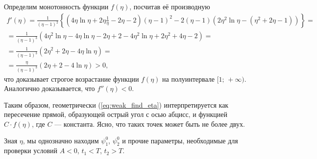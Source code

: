 Определим монотонность функции $f(\eta)$, посчитав её производную
\begin{multline}
f'(\eta) = \frac1{(\eta-1)^2}\left\{\left(4\eta\ln\eta + 2\eta\frac1\eta - 2\eta - 2\right)(\eta-1)^2 - 2(\eta-1)(2\eta^2\ln\eta - (\eta^2+2\eta-1))\right\} = \\ = \frac1{(\eta - 1)^3}( 4\eta^2\ln\eta - 4\eta\ln\eta-2\eta+2-4\eta^2\ln\eta+2\eta^2+4\eta-2) = \\ = \frac1{(\eta-1)^3}(2\eta^2 + 2\eta - 4\eta\ln\eta) = \\ = \frac\eta{(\eta-1)^3}(2\eta+2 -4\ln\eta) > 0,
\end{multline}
что доказывает строгое возрастание функции $f(\eta)$ на полуинтервале $[1;\,+\infty)$. Аналогично доказывается, что $f''(\eta) < 0$.

Таким образом, геометрически (\ref{eq:weak_find_eta}) интерпретируется как пересечение прямой, образующей острый угол с осью абцисс, и функцией $C\cdot f(\eta)$, где $C$ --- константа. Ясно, что таких точек может быть не более двух.

Зная $\eta$, мы однозначно находим $\psi_1^0$, $\psi_2^0$ и прочие параметры, необходимые для проверки условий $A < 0$, $t_1 < T$, $t_2 > T$.